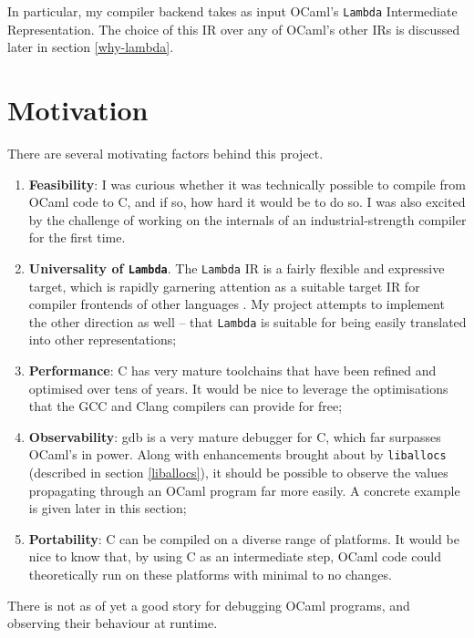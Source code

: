 \documentclass[12pt,a4paper,twoside,openright]{report}
\begin{document}
In particular, my compiler backend takes as input OCaml's \lstinline!Lambda!
Intermediate Representation. The choice of this IR over any of OCaml's other IRs
is discussed later in section \ref{why-lambda}.

\section{Motivation}

There are several motivating factors behind this project.

\begin{enumerate}
    \item \textbf{Feasibility}: I was curious whether it was technically
        possible to compile from OCaml code to C, and if so, how hard it would
        be to do so. I was also excited by the challenge of working on the
        internals of an industrial-strength compiler for the first time.
    \item \textbf{Universality of \lstinline!Lambda!}. The
        \lstinline!Lambda! IR is a fairly flexible and
        expressive target, which is rapidly garnering attention as a
        suitable target IR for compiler frontends of other languages
        \cite{dolan16}. My project attempts to implement the other direction as
        well -- that \lstinline!Lambda! is suitable for being easily translated
        into other representations;
    \item \textbf{Performance}: C has very mature toolchains that have been
        refined and optimised over tens of years. It would be nice to leverage
        the optimisations that the GCC and Clang compilers can provide for
        free;
    \item \textbf{Observability}: gdb is a very mature debugger for C, which
        far surpasses OCaml's in power. Along with enhancements brought about
        by \lstinline!liballocs! (described in section
        \ref{liballocs}), it should be possible to observe the values propagating
        through an OCaml program far more easily. A concrete example is given
        later in this section;
    \item \textbf{Portability}: C can be compiled on a diverse range of
        platforms. It would be nice to know that, by using C as an intermediate
        step, OCaml code could theoretically run on these platforms with
        minimal to no changes.
\end{enumerate}

There is not as of yet a good story for debugging OCaml programs, and
observing their behaviour at runtime.
\end{document}
